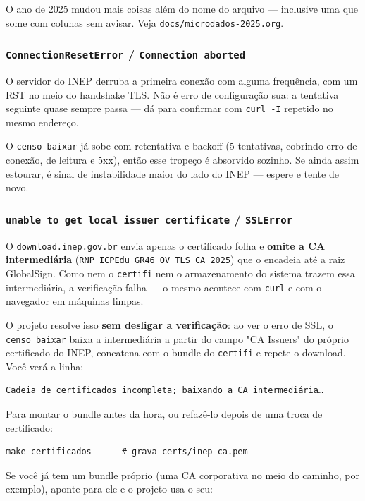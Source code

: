 \documentclass[11pt]{article}
\begin{document}
O ano de 2025 mudou mais coisas além do nome do arquivo — inclusive uma que
some com colunas sem avisar. Veja \href{docs/microdados-2025.org}{\texttt{docs/microdados-2025.org}}.
\subsubsection*{\texttt{ConnectionResetError} / \texttt{Connection aborted}}
\label{sec:org22d5800}

O servidor do INEP derruba a primeira conexão com alguma frequência, com um RST
no meio do handshake TLS. Não é erro de configuração sua: a tentativa seguinte
quase sempre passa — dá para confirmar com \texttt{curl -I} repetido no mesmo
endereço.

O \texttt{censo baixar} já sobe com retentativa e backoff (5 tentativas, cobrindo erro
de conexão, de leitura e 5xx), então esse tropeço é absorvido sozinho. Se ainda
assim estourar, é sinal de instabilidade maior do lado do INEP — espere e tente
de novo.
\subsubsection*{\texttt{unable to get local issuer certificate} / \texttt{SSLError}}
\label{sec:orgc87cade}

O \texttt{download.inep.gov.br} envia apenas o certificado folha e \textbf{omite a CA
intermediária} (\texttt{RNP ICPEdu GR46 OV TLS CA 2025}) que o encadeia até a raiz
GlobalSign. Como nem o \texttt{certifi} nem o armazenamento do sistema trazem essa
intermediária, a verificação falha — o mesmo acontece com \texttt{curl} e com o
navegador em máquinas limpas.

O projeto resolve isso \textbf{sem desligar a verificação}: ao ver o erro de SSL, o
\texttt{censo baixar} baixa a intermediária a partir do campo "CA Issuers" do próprio
certificado do INEP, concatena com o bundle do \texttt{certifi} e repete o download.
Você verá a linha:

\begin{verbatim}
Cadeia de certificados incompleta; baixando a CA intermediária…
\end{verbatim}


Para montar o bundle antes da hora, ou refazê-lo depois de uma troca de
certificado:

\begin{verbatim}
make certificados      # grava certs/inep-ca.pem
\end{verbatim}

Se você já tem um bundle próprio (uma CA corporativa no meio do caminho, por
exemplo), aponte para ele e o projeto usa o seu:
\end{document}
